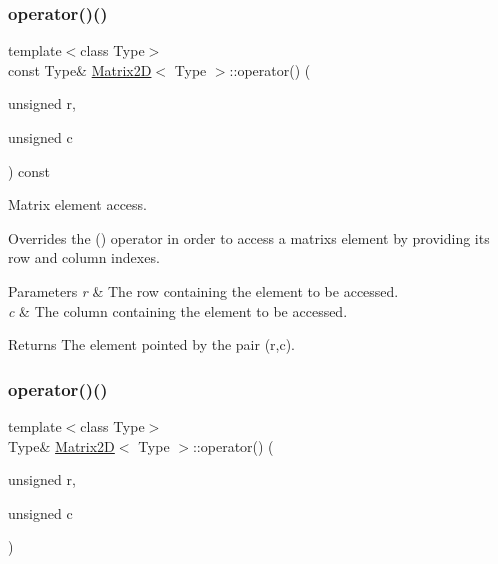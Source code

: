 \subsubsection{\texorpdfstring{operator()()}{operator()()}\hspace{0.1cm}{\footnotesize\ttfamily [1/4]}}
{\footnotesize\ttfamily template$<$class Type$>$ \\
const Type\& \mbox{\hyperlink{classMatrix2D}{Matrix2D}}$<$ Type $>$\+::operator() (\begin{DoxyParamCaption}\item[{unsigned}]{r,  }\item[{unsigned}]{c }\end{DoxyParamCaption}) const\hspace{0.3cm}{\ttfamily [inline]}}



Matrix element access. 

Overrides the \textquotesingle{}()\textquotesingle{} operator in order to access a matrix\textquotesingle{}s element by providing its row and column indexes. 
\begin{DoxyParams}{Parameters}
{\em r} & The row containing the element to be accessed. \\
\hline
{\em c} & The column containing the element to be accessed. \\
\hline
\end{DoxyParams}
\begin{DoxyReturn}{Returns}
The element pointed by the pair (r,c). 
\end{DoxyReturn}
\mbox{\label{classMatrix2D_a448fd38c905dd2879244ac345c76b14e}} 
\subsubsection{\texorpdfstring{operator()()}{operator()()}\hspace{0.1cm}{\footnotesize\ttfamily [2/4]}}
{\footnotesize\ttfamily template$<$class Type$>$ \\
Type\& \mbox{\hyperlink{classMatrix2D}{Matrix2D}}$<$ Type $>$\+::operator() (\begin{DoxyParamCaption}\item[{unsigned}]{r,  }\item[{unsigned}]{c }\end{DoxyParamCaption})\hspace{0.3cm}{\ttfamily [inline]}}



